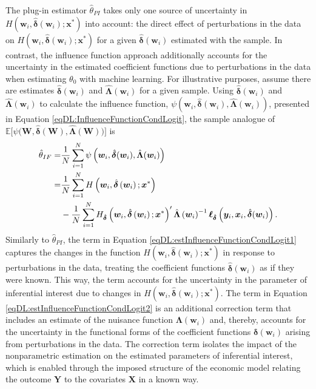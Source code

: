\documentclass[a4paper, 12pt]{article}
\begin{document}
The plug-in estimator $\hat{\theta}_{PI}$ takes only one source of uncertainty in  $H(\bm{w}_i,\hat{\bm{\delta}}(\bm{w}_i);\bm{x}^*)$ into account: the direct effect of perturbations in the data on $H(\bm{w}_i,\hat{\bm{\delta}}(\bm{w}_i);\bm{x}^*)$ for a given $\hat{\bm{\delta}}(\bm{w}_i)$ estimated with the sample.
In contrast, the influence function approach additionally accounts for the uncertainty in the estimated coefficient functions due to perturbations in the data when estimating $\theta_0$ with machine learning.
For illustrative purposes, assume there are estimates $\hat{\bm{\delta}}(\bm{w}_i)$ and $\hat{\bm{\Lambda}}(\bm{w}_i)$ for a given sample. Using $\hat{\bm{\delta}}(\bm{w}_i)$ and $\hat{\bm{\Lambda}}(\bm{w}_i)$ to calculate the influence function, $\psi(\bm{w}_i,\hat{\bm{\delta}}(\bm{w}_i),\hat{\bm{\Lambda}}(\bm{w}_i))$, presented in Equation \eqref{eqDL:InfluenceFunctionCondLogit}, the sample analogue of  $\mathbb{E}\big[\psi\big(\bm{W},\hat{\bm{\delta}}\left(\bm{W}\right),\hat{\bm{\Lambda}}\left(\bm{W}\right) \big)\big]$  is
 \begin{subequations} \label{eqDL:estInfluenceFunctionCondLogit}
\begin{align}
\hat{\theta}_{IF} =& \frac{1}{N}\sum\limits_{i=1}^N \psi\left(\bm{w}_i,\hat{\bm{\delta}}(\bm{w}_i),\hat{\bm{\Lambda}}(\bm{w}_i)\right)\notag\\ 
 =& \frac{1}{N}\sum\limits_{i=1}^N  H\left(\bm{w}_i,\hat{\bm{\delta}}\left(\bm{w}_i\right);\bm{x}^*\right) \label{eqDL:estInfluenceFunctionCondLogit1} \\
 & - \frac{1}{N}\sum\limits_{i=1}^N  H_{\hat{\bm{\delta}}}\left(\bm{w}_i,\hat{\bm{\delta}}\left(\bm{w}_i\right);\bm{x}^*\right)^{\prime}\hat{\bm{\Lambda}}\left(\bm{w}_i\right)^{-1}\bm{\ell}_{\hat{\bm{\delta}}}\left(\bm{y}_i,\bm{x}_i,\hat{\bm{\delta}}(\bm{w}_i)\right).  \label{eqDL:estInfluenceFunctionCondLogit2}
\end{align}
\end{subequations}
Similarly to $\hat{\theta}_{PI}$, the term in Equation \eqref{eqDL:estInfluenceFunctionCondLogit1} captures the changes in the function $H(\bm{w}_i, \hat{\bm{\delta}}(\bm{w}_i);\bm{x}^*)$ in response to perturbations in the data, treating the coefficient functions $\hat{\bm{\delta}}(\bm{w}_i)$ as if they were known. This way, the term accounts for the uncertainty in the parameter of inferential interest due to changes in $H(\bm{w}_i, \hat{\bm{\delta}}(\bm{w}_i);\bm{x}^*)$. The term in Equation \eqref{eqDL:estInfluenceFunctionCondLogit2} is an additional correction term that includes an estimate of the nuisance function $\bm{\Lambda}(\bm{w}_i)$ and, thereby, accounts for the uncertainty in  the functional forms of the coefficient functions $\bm{\delta}(\bm{w}_i)$ arising from perturbations in the data. The correction term isolates the impact of the nonparametric estimation on the estimated parameters of inferential interest, which is enabled through the imposed structure of the economic model relating the outcome $\bm{Y}$ to the covariates $\bm{X}$ in a known way.
\end{document}
